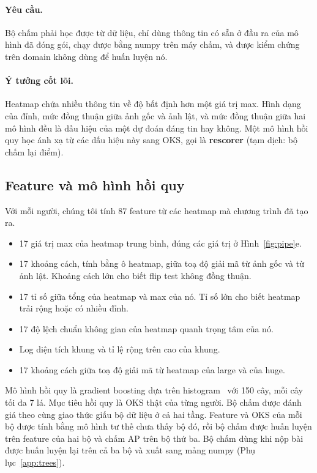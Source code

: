 \documentclass[11pt,a4paper]{article}
\begin{document}
\paragraph{Yêu cầu.} Bộ chấm phải học được từ dữ liệu, chỉ dùng thông tin có sẵn ở đầu ra của mô hình đã đóng gói, chạy được bằng numpy trên máy chấm, và được kiểm chứng trên domain không dùng để huấn luyện nó.

\paragraph{Ý tưởng cốt lõi.} Heatmap chứa nhiều thông tin về độ bất định hơn một giá trị max. Hình dạng của đỉnh, mức đồng thuận giữa ảnh gốc và ảnh lật, và mức đồng thuận giữa hai mô hình đều là dấu hiệu của một dự đoán đáng tin hay không. Một mô hình hồi quy học ánh xạ từ các dấu hiệu này sang OKS, gọi là \textbf{rescorer} (tạm dịch: bộ chấm lại điểm).

\subsection{Feature và mô hình hồi quy}

Với mỗi người, chúng tôi tính 87 feature từ các heatmap mà chương trình đã tạo ra.

\begin{itemize}[leftmargin=1.4em]
\item 17 giá trị max của heatmap trung bình, đúng các giá trị ở Hình~\ref{fig:pipe}e.
\item 17 khoảng cách, tính bằng ô heatmap, giữa toạ độ giải mã từ ảnh gốc và từ ảnh lật. Khoảng cách lớn cho biết flip test không đồng thuận.
\item 17 tỉ số giữa tổng của heatmap và max của nó. Tỉ số lớn cho biết heatmap trải rộng hoặc có nhiều đỉnh.
\item 17 độ lệch chuẩn không gian của heatmap quanh trọng tâm của nó.
\item Log diện tích khung và tỉ lệ rộng trên cao của khung.
\item 17 khoảng cách giữa toạ độ giải mã từ heatmap của large và của huge.
\end{itemize}

Mô hình hồi quy là gradient boosting dựa trên histogram~\cite{friedman,lightgbm} với 150 cây, mỗi cây tối đa 7 lá. Mục tiêu hồi quy là OKS thật của từng người. Bộ chấm được đánh giá theo cùng giao thức giấu bộ dữ liệu ở cả hai tầng. Feature và OKS của mỗi bộ được tính bằng mô hình tư thế chưa thấy bộ đó, rồi bộ chấm được huấn luyện trên feature của hai bộ và chấm AP trên bộ thứ ba. Bộ chấm dùng khi nộp bài được huấn luyện lại trên cả ba bộ và xuất sang mảng numpy (Phụ lục~\ref{app:trees}).
\end{document}
